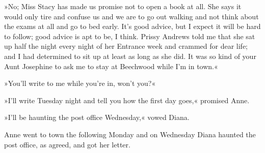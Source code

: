 »No; Miss Stacy has made us promise not to open a book at all. She says it would only tire and confuse us and we are to go out walking and not think about the exams at all and go to bed early. It's good advice, but I expect it will be hard to follow; good advice is apt to be, I think. Prissy Andrews told me that she sat up half the night every night of her Entrance week and crammed for dear life; and I had determined to sit up at least as long as she did. It was so kind of your Aunt Josephine to ask me to stay at Beechwood while I'm in town.«

»You'll write to me while you're in, won't you?«

»I'll write Tuesday night and tell you how the first day goes,« promised Anne.

»I'll be haunting the post office Wednesday,« vowed Diana.

Anne went to town the following Monday and on Wednesday Diana haunted the post office, as agreed, and got her letter.

